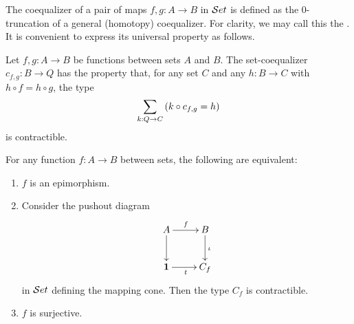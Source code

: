 The coequalizer of a pair of maps $f,g:A\to B$ in $\mathcal{S}et$ is defined as the 0-truncation of a general (homotopy) coequalizer.
For clarity, we may call this the .
%
%
It is convenient to express its universal property as follows.

\begin{lem}
%
Let $f,g:A\to B$ be functions between sets $A$ and $B$. The 
{set-co}equalizer $c_{f,g}:B\to Q$ has the property that, for any set $C$ and any $h:B\to C$ with $h\circ f = h\circ g$, the type
\begin{equation*}
\sm{k:Q\to C} (k\circ c_{f,g} = h)
\end{equation*}
is contractible.
\end{lem}

\begin{lem}\label{epis-surj}
For any function $f:A\to B$ between sets, the following are equivalent:
\begin{enumerate}
\item $f$ is an epimorphism.
\item Consider the pushout diagram
\begin{equation*}
  \xymatrix{
    {A}
    \ar[r]^{f}
    \ar[d]
    &
    {B}
    \ar[d]^{\iota}
    \\
    {\unit}
    \ar[r]_{t}
    &
    {C_f}
  }
\end{equation*}
in $\mathcal{S}et$ defining the mapping cone. Then the type $C_f$ is contractible.
\item $f$ is surjective.
\end{enumerate}
\end{lem}

